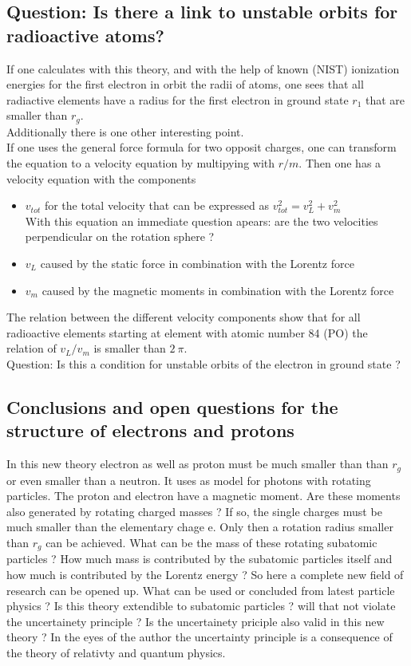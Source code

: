 \documentclass[10pt,titlepage]{article}
\begin{document}
\subsection{Question: Is there a link to unstable orbits for radioactive atoms?}
If one calculates with this theory, and with the help of known (NIST) ionization energies for the first electron in orbit the radii of atoms, one sees that all radiactive elements have a radius for the first electron in ground state $r_1$ that are smaller than $r_g$.
\\
Additionally there is one other  interesting point.
\\
If one uses the general force formula for two opposit charges, one can transform the equation to a velocity equation by multipying with $r/m$. Then one has a velocity equation with the components
\begin{itemize}
	\item $v_{tot}$ for the total velocity that can be expressed as $v_{tot}^2=v_L^2+v_m^2$\\
	With this equation an immediate question apears: are the two velocities perpendicular on the rotation sphere ?
	\item $v_L$ caused by the static force in combination with the Lorentz force
	\item $v_m$ caused by the magnetic moments in combination with the Lorentz force
\end{itemize}
The relation between the different velocity components show that for all radioactive elements starting at element with atomic number 84 (PO) the relation of $v_L/v_m$ is smaller than $2 \ \pi$.\\
Question: Is this a condition for unstable orbits of the electron in ground state ?


\subsection{Conclusions and open questions for the structure of electrons and protons}
In this new theory electron as well as proton must be much smaller than than $r_g$ or even smaller than a neutron.
It uses as model for photons with rotating particles. The proton and electron have a magnetic moment. Are these moments also generated by rotating charged masses ? If so, the single charges must be much smaller than the elementary chage e. Only then a rotation radius smaller than $r_g$ can be achieved. What can be the mass of these rotating subatomic particles ?
How much mass is contributed by the subatomic particles itself and how much is contributed by the Lorentz energy ?
So here a complete new field of research can be opened up. What can be used or concluded from latest particle physics ?
Is this theory extendible to subatomic particles ? will that not violate the uncertainety principle ?  Is the uncertainety priciple also valid in this new theory ?  In the eyes of the author the uncertainty principle is a consequence of the theory of relativty and quantum physics. 
\end{document}
